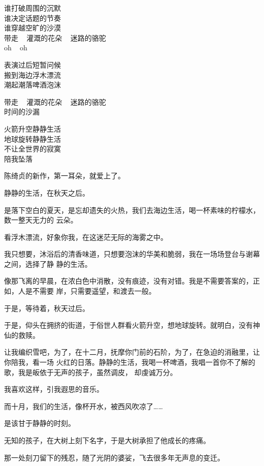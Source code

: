 			谁打破周围的沉默 \\
			谁决定话题的节奏 \\
			谁穿越空旷的沙漠 \\
			带走 ~ 灌溉的花朵 ~ 迷路的骆驼 \\
			oh ~ oh

			表演过后短暂问候 \\
			搬到海边浮木漂流 \\
			潮起潮落啤酒泡沫

			带走 ~ 灌溉的花朵 ~ 迷路的骆驼 \\
			时间的沙漏

			火箭升空静静生活 \\
			地球旋转静静生活 \\
			不让全世界的寂寞 \\
			陪我坠落
		\endlongpoem

		陈绮贞的新作，第一耳朵，就爱上了。

		静静的生活，在秋天之后。

		是落下空白的夏天，是忘却遗失的火热，我们去海边生活，喝一杯素味的柠檬水，数一整天无力的
	云朵。

		看浮木漂流，好象你我，在这迷茫无际的海雾之中。


		我只想要，沐浴后的清香味道，只想要泡沫的华美和脆弱，我在一场场登台与谢幕之间，选择了静
	静的生活。

		像那飞离的早晨，在浓白色中消散，没有痕迹，没有对错。我是不需要答案的，正如，人是不需要
	岸，只需要遥望，和渡去一般。


		于是，等待着，秋天过后。

		于是，仰头在拥挤的街道，于俗世人群看火箭升空，想地球旋转。就明白，没有神仙的救赎。

		让我编织雪吧，为了，在十二月，抚摩你门前的石阶，为了，在急迫的消融里，让你陪我，看一场
	火红的日落。静静的生活，我喝一杯啤酒，我唱一首你不了解的歌，我是皈依于无声的孩子，虽然调皮，
	却虔诚万分。


		\vspace{1em}
		我喜欢这样，引我遐思的音乐。

		而十月，我们的生活，像杯开水，被西风吹凉了……

		是该甘于静静的时刻。

	\endwriting



		无知的孩子，在大树上刻下名字，于是大树承担了他成长的疼痛。

		那一处刻刀留下的残忍，随了光阴的婆娑，飞去很多年无声息的变迁。


